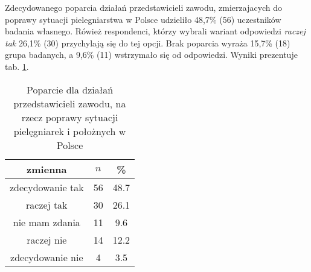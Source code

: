 

Zdecydowanego poparcia działań przedstawicieli zawodu, zmierzajacych do poprawy sytuacji pielegniarstwa w Polsce udzieliło 48,7\% (56) uczestników badania własnego. Rówież respondenci, którzy wybrali wariant odpowiedzi  \textit{raczej tak} 26,1\% (30) przychylają się do tej opcji. Brak poparcia wyraża 15,7\% (18) grupa badanych, a 9,6\% (11) wstrzymało się od odpowiedzi. Wyniki prezentuje tab. \ref{tab:Q19}.



\begin{table}[H]
\caption{Poparcie dla działań przedstawicieli zawodu, na rzecz poprawy sytuacji pielęgniarek i położnych w Polsce}
\centering
\begin{tabular}{ | c | c | c |}
\hline
zmienna & $n$ & \% \\
\hline
zdecydowanie tak  &  56  & 48.7 \\
\hline
raczej tak  &  30  & 26.1\\
\hline
nie mam zdania  &  11  & 9.6 \\
\hline
raczej nie  &  14  & 12.2 \\
\hline
zdecydowanie nie  &  4  & 3.5\\
\hline
\end{tabular}
\label{tab:Q19}
\end{table}

